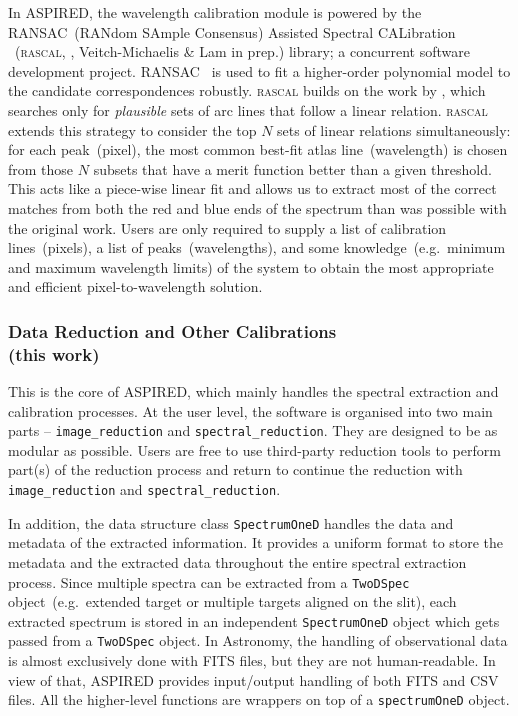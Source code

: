 \documentclass[linenumbers, twocolumn]{aastex631}
\begin{document}
In \textsc{ASPIRED}, the wavelength calibration module is powered by the
RANSAC~(RANdom SAmple Consensus) Assisted Spectral CALibration ~(\textsc{rascal},
\citealt{2020zndo...4117517V, 2020ASPC..527..627V}, Veitch-Michaelis \& Lam in prep.)
library; a concurrent software development project.
RANSAC~\citep{fischler_bolles_1981} is used to fit a higher-order polynomial
model to the candidate correspondences robustly. \textsc{rascal} builds on the
work by \citet{2018ApOpt..57.6876S}, which searches only for \textit{plausible}
sets of arc lines that follow a linear relation. \textsc{rascal} extends this strategy to
consider the top $N$ sets of linear relations simultaneously: for each
peak~(pixel), the most common best-fit atlas line~(wavelength) is chosen from
those $N$ subsets that have a merit function better than a given threshold.
This acts like a piece-wise linear fit and allows us to extract most of the
correct matches from both the red and blue ends of the spectrum than was possible with the
original work. Users are only required to supply a list of calibration
lines~(pixels), a list of peaks~(wavelengths), and some knowledge~(e.g.\ minimum
and maximum wavelength limits) of the system to obtain the most appropriate
and efficient pixel-to-wavelength solution.

\subsubsection*{Data Reduction and Other Calibrations\\(this work)}
This is the core of \textsc{ASPIRED}, which mainly handles the spectral
extraction and calibration processes. At the user level, the software is
organised into two main parts -- \texttt{image\_reduction} and
\texttt{spectral\_reduction}. They are designed to be as modular as possible.
Users are free to use third-party reduction tools to perform part(s) of 
the reduction process and return to continue the reduction with
\texttt{image\_reduction} and \texttt{spectral\_reduction}.

In addition, the data structure class \texttt{SpectrumOneD} handles the
data and metadata of the extracted information. It provides a uniform format
to store the metadata and the extracted data throughout the entire spectral
extraction process. Since multiple spectra can be extracted from a
\texttt{TwoDSpec} object~(e.g.\ extended target or multiple targets aligned on
the slit), each extracted spectrum is stored in an independent
\texttt{SpectrumOneD} object which gets passed from a \texttt{TwoDSpec} object.
In Astronomy, the handling of observational
data is almost exclusively done with FITS files, but they are not
human-readable. In view of that, \textsc{ASPIRED} provides input/output handling
of both FITS and CSV files. All the higher-level functions are wrappers on top
of a \texttt{spectrumOneD} object.
\end{document}

